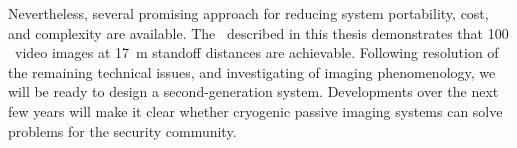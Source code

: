 Nevertheless, several promising approach for reducing system portability, cost, and complexity are available.
The \Imager\ described in this thesis demonstrates that \SI{100}{\mK} \NETD\ video images at \SI{17}{\m} standoff distances are achievable.
Following resolution of the remaining technical issues, and investigating of imaging phenomenology, we will be ready to design a second-generation system.
Developments over the next few years will make it clear whether cryogenic passive imaging systems can solve problems for the security community.

